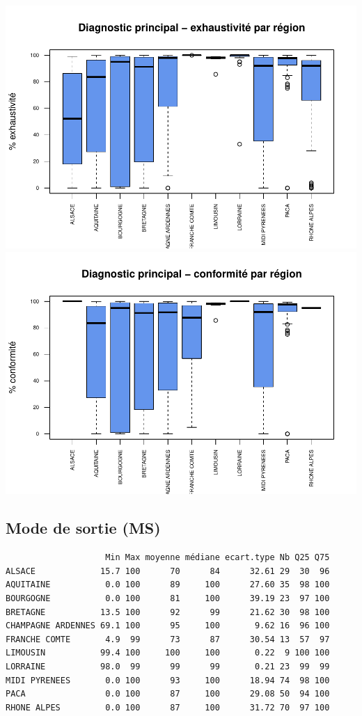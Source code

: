 \documentclass[]{article}
\begin{document}
\includegraphics{septembre2015_files/figure-latex/unnamed-chunk-36-1.pdf}
\includegraphics{septembre2015_files/figure-latex/unnamed-chunk-36-2.pdf}

\subsection{Mode de sortie (MS)}\label{mode-de-sortie-ms-2}

\begin{verbatim}
                    Min Max moyenne médiane ecart.type Nb Q25 Q75
ALSACE             15.7 100      70      84      32.61 29  30  96
AQUITAINE           0.0 100      89     100      27.60 35  98 100
BOURGOGNE           0.0 100      81     100      39.19 23  97 100
BRETAGNE           13.5 100      92      99      21.62 30  98 100
CHAMPAGNE ARDENNES 69.1 100      95     100       9.62 16  96 100
FRANCHE COMTE       4.9  99      73      87      30.54 13  57  97
LIMOUSIN           99.4 100     100     100       0.22  9 100 100
LORRAINE           98.0  99      99      99       0.21 23  99  99
MIDI PYRENEES       0.0 100      93     100      18.94 74  98 100
PACA                0.0 100      87     100      29.08 50  94 100
RHONE ALPES         0.0 100      87     100      31.72 70  97 100
\end{verbatim}
\end{document}
